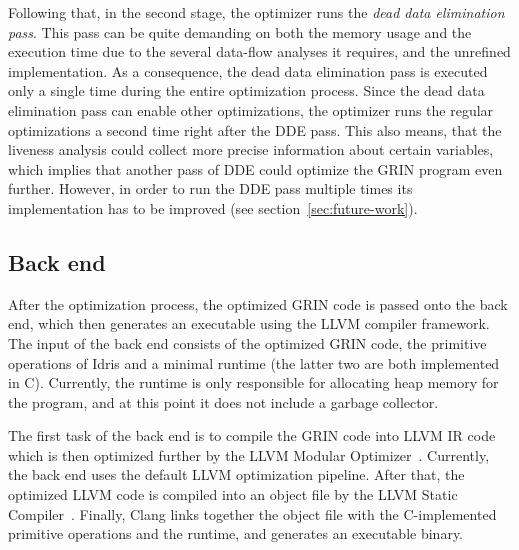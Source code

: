 \documentclass[main.tex]{subfiles}
\begin{document}
	Following that, in the second stage, the optimizer runs the \textit{dead data elimination pass}. This pass can be quite demanding on both the memory usage and the execution time due to the several data-flow analyses it requires, and the unrefined implementation. As a consequence, the dead data elimination pass is executed only a single time during the entire optimization process. Since the dead data elimination pass can enable other optimizations, the optimizer runs the regular optimizations a second time right after the DDE pass. This also means, that the liveness analysis could collect more precise information about certain variables, which implies that another pass of DDE could optimize the GRIN program even further. However, in order to run the DDE pass multiple times its implementation has to be improved (see section~\ref{sec:future-work}).
	
	\subsection{Back end}
	\label{subsec:llvm-back-end}
	
	After the optimization process, the optimized GRIN code is passed onto the back end, which then generates an executable using the LLVM compiler framework. The input of the back end consists of the optimized GRIN code, the primitive operations of Idris and a minimal runtime (the latter two are both implemented in C). Currently, the runtime is only responsible for allocating heap memory for the program, and at this point it does not include a garbage collector.
	
	The first task of the back end is to compile the GRIN code into LLVM IR code which is then optimized further by the LLVM Modular Optimizer~\cite{opt}. Currently, the back end uses the default LLVM optimization pipeline. After that, the optimized LLVM code is compiled into an object file by the LLVM Static Compiler~\cite{llc}. Finally, Clang links together the object file with the C-implemented primitive operations and the runtime, and generates an executable binary.
	
\end{document}

